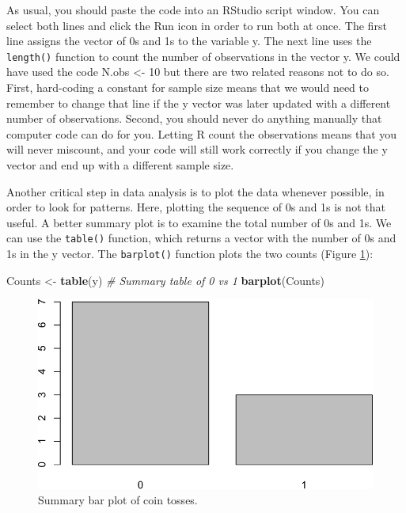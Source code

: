 \documentclass[
]{krantz}
\makeatletter
\newenvironment{Shaded}{\begin{snugshade}}{\end{snugshade}}
\newcommand{\CommentTok}[1]{\textcolor[rgb]{0.37,0.37,0.37}{\textit{#1}}}
\newcommand{\FunctionTok}[1]{\textcolor[rgb]{0.27,0.27,0.27}{\textbf{#1}}}
\newcommand{\NormalTok}[1]{#1}
\newcommand{\OtherTok}[1]{\textcolor[rgb]{0.37,0.37,0.37}{#1}}
\newenvironment{kframe}{%
\medskip{}
\setlength{\fboxsep}{.8em}
 \def\at@end@of@kframe{}%
 \ifinner\ifhmode%
  \def\at@end@of@kframe{\end{minipage}}%
  \begin{minipage}{\columnwidth}%
 \fi\fi%
 \def\FrameCommand##1{\hskip\@totalleftmargin \hskip-\fboxsep
 \colorbox{shadecolor}{##1}\hskip-\fboxsep
     \hskip-\linewidth \hskip-\@totalleftmargin \hskip\columnwidth}%
 \MakeFramed {\advance\hsize-\width
   \@totalleftmargin\z@ \linewidth\hsize
   \@setminipage}}%
 {\par\unskip\endMakeFramed%
 \at@end@of@kframe}
\renewenvironment{Shaded}{\begin{kframe}}{\end{kframe}}
\makeatother
\begin{document}
As usual, you should paste the code into an RStudio script window. You can select both lines and click the Run icon in order to run both at once. The first line assigns the vector of 0s and 1s to the variable y. The next line uses the \texttt{length()} function to count the number of observations in the vector y. We could have used the code N.obs \textless- 10 but there are two related reasons not to do so. First, hard-coding a constant for sample size means that we would need to remember to change that line if the y vector was later updated with a different number of observations. Second, you should never do anything manually that computer code can do for you. Letting R count the observations means that you will never miscount, and your code will still work correctly if you change the y vector and end up with a different sample size.

Another critical step in data analysis is to plot the data whenever possible, in order to look for patterns. Here, plotting the sequence of 0s and 1s is not that useful. A better summary plot is to examine the total number of 0s and 1s. We can use the \texttt{table()} function, which returns a vector with the number of 0s and 1s in the y vector. The \texttt{barplot()} function plots the two counts (Figure \ref{fig:coinToss}):

\begin{Shaded}
\begin{Highlighting}[]
\NormalTok{Counts }\OtherTok{\textless{}{-}} \FunctionTok{table}\NormalTok{(y)  }\CommentTok{\# Summary table of 0 vs 1}
\FunctionTok{barplot}\NormalTok{(Counts)}
\end{Highlighting}
\end{Shaded}

\begin{figure}
\includegraphics[width=0.9\linewidth]{bookdown_files/figure-latex/coinToss-1} \caption{Summary bar plot of coin tosses.}\label{fig:coinToss}
\end{figure}
\end{document}
